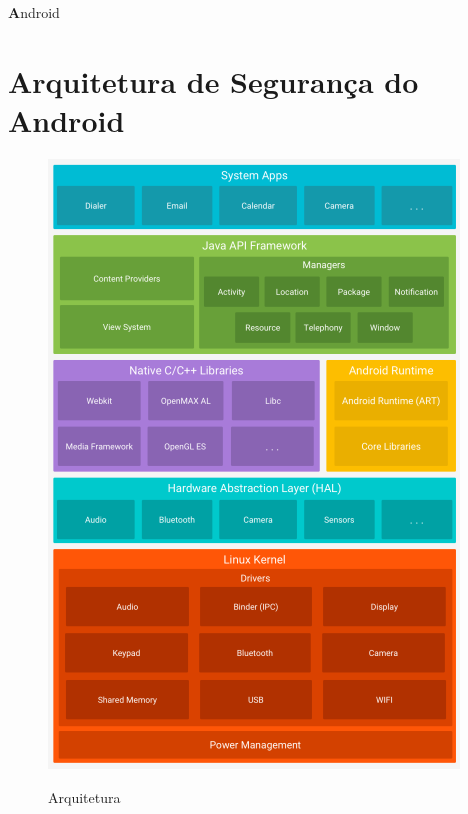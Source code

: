 




\newpage
\hfill\par
\hfill\par
\centerline{\Huge\textbf Android}\par
\hfill\par
\hfill\par
\section{Arquitetura de Segurança do Android}
\begin{figure}[h!]
\centering
\includegraphics[scale=0.6]{arquiteturaAndroid.png}
\label{fig:arq}
\caption{Arquitetura}
\end{figure}

